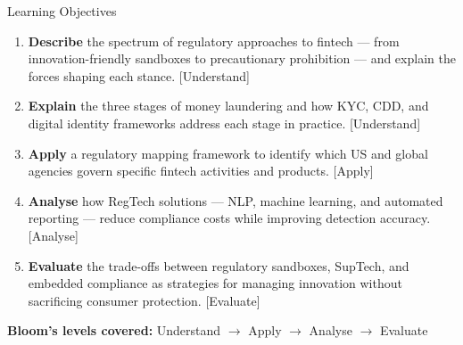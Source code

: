 \begin{frame}{Learning Objectives}
  \begin{enumerate}
    \item \textbf{Describe} the spectrum of regulatory approaches to fintech ---
          from innovation-friendly sandboxes to precautionary prohibition ---
          and explain the forces shaping each stance.
          \textcolor{mlgray}{\small[Understand]}
    \item \textbf{Explain} the three stages of money laundering and how KYC, CDD,
          and digital identity frameworks address each stage in practice.
          \textcolor{mlgray}{\small[Understand]}
    \item \textbf{Apply} a regulatory mapping framework to identify which US and
          global agencies govern specific fintech activities and products.
          \textcolor{mlgray}{\small[Apply]}
    \item \textbf{Analyse} how RegTech solutions --- NLP, machine learning, and
          automated reporting --- reduce compliance costs while improving
          detection accuracy.
          \textcolor{mlgray}{\small[Analyse]}
    \item \textbf{Evaluate} the trade-offs between regulatory sandboxes,
          SupTech, and embedded compliance as strategies for managing
          innovation without sacrificing consumer protection.
          \textcolor{mlgray}{\small[Evaluate]}
  \end{enumerate}
  \vspace{0.4em}
  \textcolor{mlpurple}{\textbf{Bloom's levels covered:}} Understand $\to$ Apply $\to$ Analyse $\to$ Evaluate
\end{frame}


